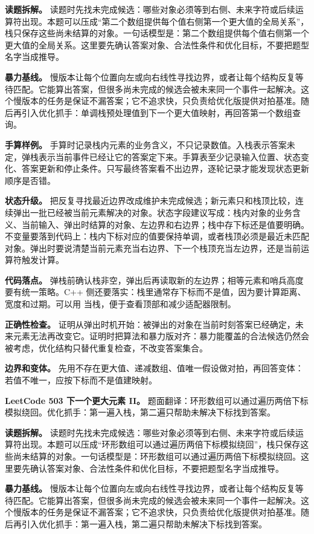 \textbf{读题拆解。} 读题时先找未完成候选：哪些对象必须等到右侧、未来字符或后续运算符出现。本题可以压成“第二个数组提供每个值右侧第一个更大值的全局关系”，栈只保存这些尚未结算的对象。一句话模型是：第二个数组提供每个值右侧第一个更大值的全局关系。这里要先确认答案对象、合法性条件和优化目标，不要把题型名字当成推导。

\textbf{暴力基线。} 慢版本让每个位置向左或向右线性寻找边界，或者让每个结构反复等待匹配。它能算出答案，但很多尚未完成的候选会被未来同一个事件一起解决。这个慢版本的任务是保证不漏答案；它不追求快，只负责给优化版提供对拍基准。随后再引入优化抓手：单调栈预处理值到下一个更大值映射，再回答第一个数组查询。

\textbf{手算样例。} 手算时记录栈内元素的业务含义，不只记录数值。入栈表示答案未定，弹栈表示当前事件已经让它的答案定下来。手算表至少记录输入位置、状态变化、答案更新和停止条件。只写最终答案看不出边界，逐轮记录才能发现状态更新顺序是否错。

\textbf{状态升级。} 把反复寻找最近边界改成维护未完成候选；新元素只和栈顶比较，连续弹出一批已经被当前元素解决的对象。状态字段建议写成：栈内对象的业务含义、当前输入、弹出时结算的对象、左边界和右边界；栈中存下标还是值要明确。不变量要落到代码上：栈内下标对应的值要保持单调，或者栈顶必须是最近未匹配对象。弹出时要说清楚当前元素充当右边界、下一个栈顶充当左边界，还是当前运算符触发计算。

\textbf{代码落点。} 弹栈前确认栈非空，弹出后再读取新的左边界；相等元素和哨兵高度要有统一策略。C++ 侧还要落实：栈里通常存下标而不是值，因为要计算距离、宽度和过期。可以用  当栈，便于查看顶部和减少适配器限制。

\textbf{正确性检查。} 证明从弹出时机开始：被弹出的对象在当前时刻答案已经确定，未来元素无法再改变它。证明时把算法和暴力版对齐：暴力能覆盖的合法候选仍然会被考虑，优化结构只替代重复检查，不改变答案集合。

\textbf{边界和变体。} 先用不存在更大值、递减数组、值唯一假设做对拍，再回答变体：若值不唯一，应按下标而不是值建映射。

\noindent\textbf{LeetCode 503 下一个更大元素 II。} 题面翻译：环形数组可以通过遍历两倍下标模拟绕回。优化抓手：第一遍入栈，第二遍只帮助未解决下标找到答案。

\textbf{读题拆解。} 读题时先找未完成候选：哪些对象必须等到右侧、未来字符或后续运算符出现。本题可以压成“环形数组可以通过遍历两倍下标模拟绕回”，栈只保存这些尚未结算的对象。一句话模型是：环形数组可以通过遍历两倍下标模拟绕回。这里要先确认答案对象、合法性条件和优化目标，不要把题型名字当成推导。

\textbf{暴力基线。} 慢版本让每个位置向左或向右线性寻找边界，或者让每个结构反复等待匹配。它能算出答案，但很多尚未完成的候选会被未来同一个事件一起解决。这个慢版本的任务是保证不漏答案；它不追求快，只负责给优化版提供对拍基准。随后再引入优化抓手：第一遍入栈，第二遍只帮助未解决下标找到答案。

